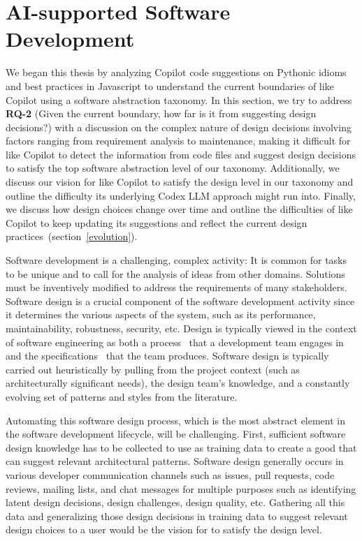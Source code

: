 \section{AI-supported Software Development}
\label{cs2design}
We began this thesis by analyzing Copilot code suggestions on Pythonic idioms and best practices in Javascript to understand the current boundaries of \cct{} like Copilot using a software abstraction taxonomy.
In this section, we try to address \textbf{RQ-2} (Given the current boundary, how far is it from suggesting design decisions?) with a discussion on the complex nature of design decisions involving factors ranging from requirement analysis to maintenance, making it difficult for \cct{} like Copilot to detect the information from code files and suggest design decisions to satisfy the top software abstraction level of our taxonomy.
Additionally, we discuss our vision for \cct{} like Copilot to satisfy the design level in our taxonomy and outline the difficulty its underlying Codex LLM approach might run into.
Finally, we discuss how design choices change over time and outline the difficulties of \cct{} like Copilot to keep updating its suggestions and reflect the current design practices~(section~\ref{evolution}).

Software development is a challenging, complex activity: It is common for tasks to be unique and to call for the analysis of ideas from other domains. Solutions must be inventively modified to address the requirements of many stakeholders.
Software design is a crucial component of the software development activity since it determines the various aspects of the system, such as its performance, maintainability, robustness, security, etc.
Design is typically viewed in the context of software engineering as both a process~\cite{design} that a development team engages in and the specifications~\cite{designdef} that the team produces. 
Software design is typically carried out heuristically by pulling from the project context (such as architecturally significant needs), the design team's knowledge, and a constantly evolving set of patterns and styles from the literature. 

Automating this software design process, which is the most abstract element in the software development lifecycle, will be challenging. 
First, sufficient software design knowledge has to be collected to use as training data to create a good \cct{} that can suggest relevant architectural patterns. 
Software design generally occurs in various developer communication channels such as issues, pull requests, code reviews, mailing lists, and chat messages for multiple purposes such as identifying latent design decisions, design challenges, design quality, etc. 
Gathering all this data and generalizing those design decisions in training data to suggest relevant design choices to a user would be the vision for \cct{} to satisfy the design level.

